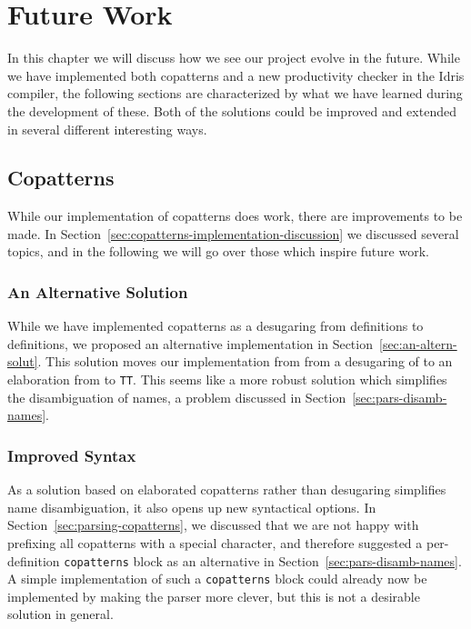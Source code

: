 
\chapter{Future Work}
\label{cha:future-work}
In this chapter we will discuss how we see our project evolve in the
future. While we have implemented both copatterns and a new productivity checker
in the Idris compiler, the following sections are characterized by what we have learned
during the development of these. Both of the solutions could be improved
and extended in several different interesting ways. 

\section{Copatterns}
While our implementation of copatterns does work, there are improvements to be
made. In Section~\ref{sec:copatterns-implementation-discussion} we discussed
several topics, and in the following we will go over those which inspire future work.
\subsection{An Alternative Solution}
While we have implemented copatterns as a desugaring from \IdrisM{} definitions
to \IdrisM{} definitions,
we proposed an alternative implementation in
Section~\ref{sec:an-altern-solut}. This solution moves our implementation from
from a desugaring of \IdrisM{} to an elaboration from \IdrisM{} to
\texttt{TT}. This seems like a more robust solution which simplifies the disambiguation
of names, a problem discussed in Section~\ref{sec:pars-disamb-names}.
\subsection{Improved Syntax}
As a solution based on elaborated copatterns rather than desugaring
simplifies name disambiguation, it also opens up new syntactical options. In
Section~\ref{sec:parsing-copatterns}, we discussed that we are not happy with
prefixing all copatterns with a special character, and therefore suggested a
per-definition \texttt{copatterns} block as an alternative in
Section~\ref{sec:pars-disamb-names}. A simple implementation of such a
\texttt{copatterns} block could already now be implemented by making the parser
more clever, but this is not a desirable solution in general.
